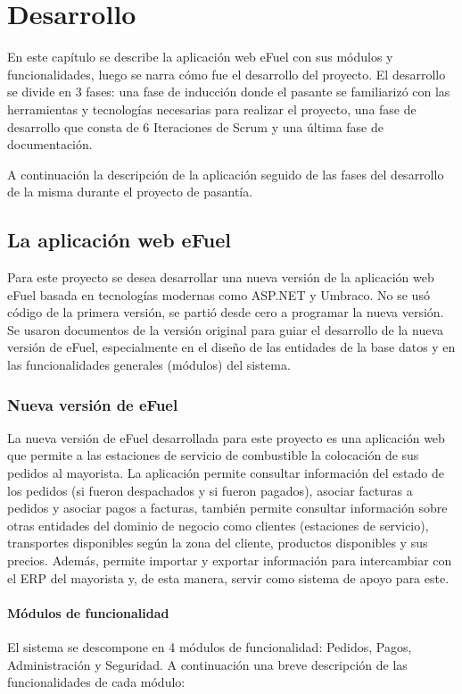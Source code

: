 \chapter{Desarrollo} \label{development}
En este capítulo se describe la aplicación web eFuel con sus módulos y funcionalidades, luego se narra cómo fue el desarrollo del proyecto. El desarrollo se divide en 3 fases: una fase de inducción donde el pasante se familiarizó con las herramientas y tecnologías necesarias para realizar el proyecto, una fase de desarrollo que consta de 6 Iteraciones de Scrum y una última fase de documentación.

A continuación la descripción de la aplicación seguido de las fases del desarrollo de la misma durante el proyecto de pasantía.

\section{La aplicación web eFuel}
Para este proyecto se desea desarrollar una nueva versión de la aplicación web eFuel basada en tecnologías modernas como ASP.NET y Umbraco. No se usó código de la primera versión, se partió desde cero a programar la nueva versión. Se usaron documentos de la versión original para guiar el desarrollo de la nueva versión de eFuel, especialmente en el diseño de las entidades de la base datos y en las funcionalidades generales (módulos) del sistema.

\subsection{Nueva versión de eFuel}
La nueva versión de eFuel desarrollada para este proyecto es una aplicación web que permite a las estaciones de servicio de combustible la colocación de sus pedidos al mayorista. La aplicación permite consultar información del estado de los pedidos (si fueron despachados y si fueron pagados), asociar facturas a pedidos y asociar pagos a facturas, también permite consultar información sobre otras entidades del dominio de negocio como clientes (estaciones de servicio), transportes disponibles según la zona del cliente, productos disponibles y sus precios. Además, permite importar y exportar información para intercambiar con el \ac{ERP} del mayorista y, de esta manera, servir como sistema de apoyo para este.

\subsubsection{Módulos de funcionalidad}
El sistema se descompone en 4 módulos de funcionalidad: Pedidos, Pagos, Administración y Seguridad. A continuación una breve descripción de las funcionalidades de cada módulo:

